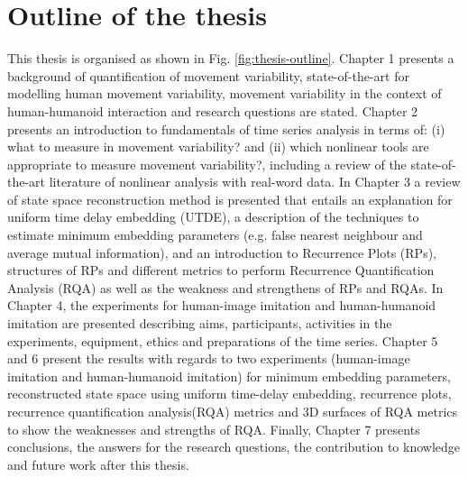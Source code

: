 \section{Outline of the thesis}
This thesis is organised as shown in Fig. \ref{fig:thesis-outline}.
Chapter 1 presents a background of quantification of 
movement variability, state-of-the-art 
for modelling human movement variability,
movement variability in the context of 
human-humanoid interaction and research questions are stated.
Chapter 2 presents an introduction to fundamentals of time series
analysis in terms of: (i) what to measure in movement variability?
and (ii) which nonlinear tools are appropriate to measure movement variability?, 
including a review of the state-of-the-art literature of nonlinear 
analysis with real-word data. 
In Chapter 3 a review of state space reconstruction method is presented 
that entails an explanation for uniform time 
delay embedding (UTDE), a description of the techniques to estimate 
minimum embedding parameters (e.g. false nearest neighbour and 
average mutual information), and an introduction to Recurrence Plots (RPs),
structures of RPs and different metrics to perform 
Recurrence Quantification Analysis (RQA) as well as the 
weakness and strengthens of RPs and RQAs.
In Chapter 4, the experiments for human-image imitation and human-humanoid 
imitation are presented describing aims, participants, activities in the 
experiments, equipment, ethics and preparations of the time series.
Chapter 5 and 6 present the results with regards to two experiments
(human-image imitation and human-humanoid imitation) for 
minimum embedding parameters, reconstructed state space using 
uniform time-delay embedding, recurrence plots, recurrence quantification 
analysis(RQA) metrics and 3D surfaces of RQA metrics to show the
weaknesses and strengths of RQA.
Finally, Chapter 7 presents conclusions, the answers for the
research questions, the contribution to knowledge and 
future work after this thesis.

